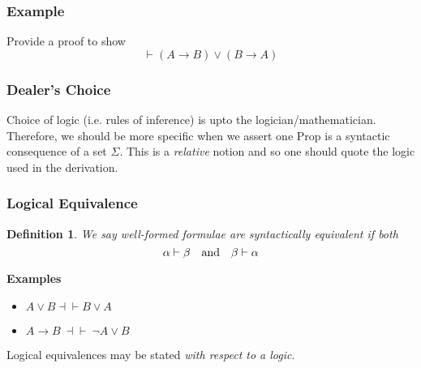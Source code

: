 \documentclass{beamer}
\theoremstyle{indentDefn} \newtheorem{defn}[]{Definition}
\begin{document}
\begin{frame}
	\frametitle{Example}
	Provide a proof to show $$ \vdash (A \to B) \lor (B \to A)$$
	\vspace{6cm}
	
	
\end{frame}

\begin{frame}
	\frametitle{Dealer's Choice}

	Choice of logic (i.e. rules of inference) is upto the logician/mathematician. Therefore, we should be more specific when we assert one Prop is a syntactic consequence of a set $\Sigma$. This is a \emph{relative} notion and so one should quote the logic used in the derivation. 

	\vspace{4cm}


\end{frame}

\begin{frame}
  \frametitle{Logical Equivalence}

	\begin{defn}We say well-formed formulae are \textit{syntactically equivalent} if both 
	$$ \alpha \vdash \beta \quad \textnormal{and} \quad \beta \vdash \alpha$$\end{defn}
	
	\vspace{0.5cm}
	
	{\bf Examples} 
	\begin{itemize}
		\item $A \lor B \dashv \vdash B  \lor  A$
		\item $A \rightarrow B \ \dashv \vdash \ \lnot A \lor B$
	\end{itemize}

	Logical equivalences may be stated \emph{with respect to a logic}.

\end{frame}
\end{document}
